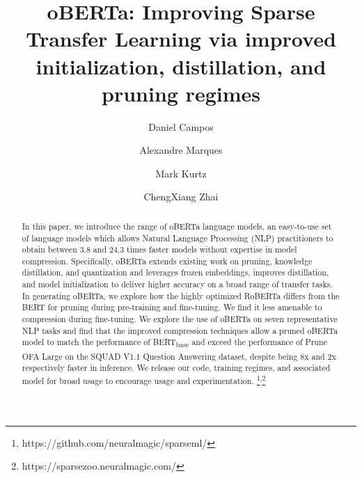 \documentclass[11pt]{article}
\title{oBERTa: Improving Sparse Transfer Learning via improved initialization, distillation, and pruning regimes }%
\author[1]{Daniel Campos }
\author[2]{Alexandre Marques}
\author[2]{Mark Kurtz}
\author[1]{ChengXiang Zhai}
\affil[1]{Department of Computer Science, the University of Illinois Urbana-Champaign}
\affil[2]{Neural Magic Inc.}
\begin{document}
\maketitle
\begin{abstract}
In this paper, we introduce the range of oBERTa language models, an easy-to-use set of language models which allows Natural Language Processing (NLP) practitioners to obtain between 3.8 and 24.3 times faster models without expertise in model compression. Specifically, oBERTa extends existing work on pruning, knowledge distillation, and quantization and leverages frozen embeddings, improves distillation, and model initialization to deliver higher accuracy on a broad range of transfer tasks. In generating oBERTa, we explore how the highly optimized RoBERTa differs from the BERT for pruning during  pre-training and fine-tuning. We find it less amenable to compression during  fine-tuning. We explore the use of oBERTa on seven representative NLP tasks and find that the improved compression techniques allow a pruned oBERTa model to match the performance of BERT\textsubscript{base} and exceed the performance of Prune OFA Large on the SQUAD V1.1 Question Answering dataset, despite being 8x and 2x respectively faster in inference. We release our code, training regimes, and associated model for broad usage to encourage usage and experimentation. \footnote{https://github.com/neuralmagic/sparseml/}\textsuperscript{,}\footnote{https://sparsezoo.neuralmagic.com/}
\end{abstract}
\end{document}
